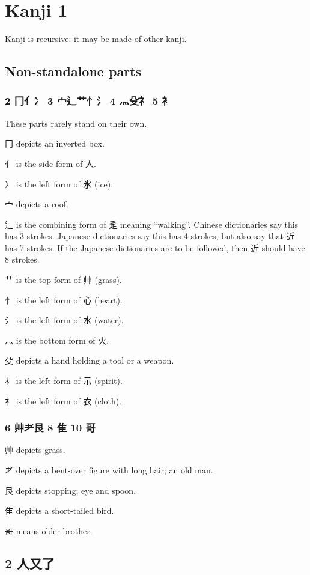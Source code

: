\chapter{Kanji 1}

Kanji is recursive: it may be made of other kanji.

\section{Non-standalone parts}

\subsection{2 冂亻冫 3 宀辶艹忄氵 4 灬殳礻 5 衤}

These parts rarely stand on their own.

冂 depicts an inverted box.

亻 is the side form of 人.

冫 is the left form of 氷 (ice).

宀 depicts a roof.

辶 is the combining form of 辵 meaning ``walking''.
Chinese dictionaries say this has 3 strokes.
Japanese dictionaries say this has 4 strokes,
but also say that 近 has 7 strokes.
If the Japanese dictionaries are to be followed,
then 近 should have 8 strokes.

艹 is the top form of 艸 (grass).

忄 is the left form of 心 (heart).

氵 is the left form of 水 (water).

灬 is the bottom form of 火.

殳 depicts a hand holding a tool or a weapon.

礻 is the left form of ⽰ (spirit).

衤 is the left form of 衣 (cloth).

\subsection{6 艸耂艮 8 隹 10 哥}

艸 depicts grass.

耂 depicts a bent-over figure with long hair; an old man.

艮 depicts stopping; eye and spoon.

隹 depicts a short-tailed bird.

哥 means older brother.

\section{2 人又了}

